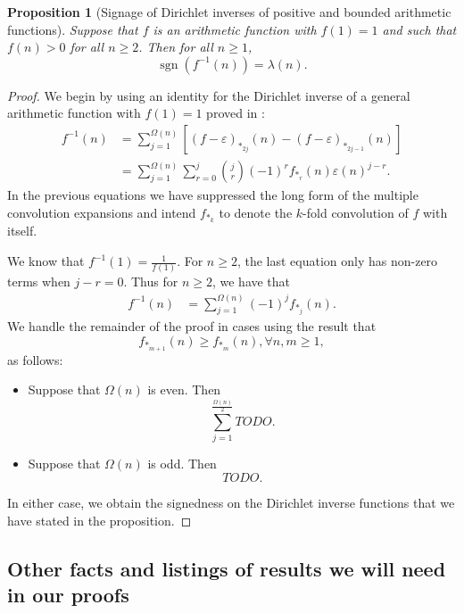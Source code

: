 \documentclass[11pt,reqno,a4letter]{article}
\numberwithin{figure}{section}
\numberwithin{table}{section}
\theoremstyle{plain}
\newtheorem{prop}[theorem]{Proposition}
\numberwithin{theorem}{section}
\theoremstyle{definition}
\begin{document}
\begin{prop}[Signage of Dirichlet inverses of positive and bounded arithmetic functions] 
\label{prop_SignageDirInvsOfPosBddArithmeticFuncs_v1} 
Suppose that $f$ is an arithmetic function with $f(1) = 1$ and such that $f(n) > 0$ 
for all $n \geq 2$. Then for all $n \geq 1$, 
\[
\operatorname{sgn}\left(f^{-1}(n)\right) = \lambda(n). 
\]
\end{prop} 
\begin{proof} 
We begin by using an identity for the 
Dirichlet inverse of a general arithmetic function with $f(1) = 1$ proved in 
\cite{MERCA-SCHMIDT-RAMJ,MOUSAVI-SCHMIDT-2019}: 
\begin{align*} 
f^{-1}(n) & = \sum_{j=1}^{\Omega(n)} \left[(f-\varepsilon)_{\ast_{2j}}(n) - 
    (f-\varepsilon)_{\ast_{2j-1}}(n)\right] \\ 
     & = \sum_{j=1}^{\Omega(n)} \sum_{r=0}^{j} \binom{j}{r} (-1)^{r} f_{\ast_r}(n) \varepsilon(n)^{j-r}. 
\end{align*} 
In the previous equations we have suppressed the long form of the multiple convolution expansions and 
intend $f_{\ast_k}$ to denote the $k$-fold convolution of $f$ with itself. 

We know that $f^{-1}(1) = \frac{1}{f(1)}$. For $n \geq 2$, the last equation only has non-zero terms 
when $j-r = 0$. Thus for $n \geq 2$, we have that 
\begin{align} 
\label{eqn_fInv_GenCvlExpFormula_v3} 
f^{-1}(n) & = \sum_{j=1}^{\Omega(n)} (-1)^{j} f_{\ast_j}(n). 
\end{align} 
We handle the remainder of the proof in cases using the result that 
\[
f_{\ast_{m+1}}(n) \geq f_{\ast_{m}}(n), \forall n, m \geq 1, 
\]
as follows: 
\begin{itemize} 
     \item Suppose that $\Omega(n)$ is even. Then 
     \[
     \sum_{j=1}^{\frac{\Omega(n)}{2}} TODO. 
     \]
     \item Suppose that $\Omega(n)$ is odd. Then 
     \[
     TODO. 
     \]
\end{itemize} 
In either case, we obtain the signedness on the Dirichlet inverse functions that we have 
stated in the proposition. 
\end{proof} 

\subsection{Other facts and listings of results we will need in our proofs} 
\end{document}
